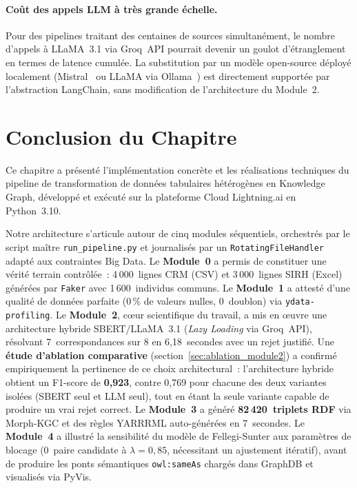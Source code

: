 \paragraph{Coût des appels LLM à très grande échelle.}
Pour des pipelines traitant des centaines de sources simultanément,
le nombre d'appels à LLaMA~3.1 via Groq~API pourrait devenir un
goulot d'étranglement en termes de latence cumulée. La substitution
par un modèle open-source déployé localement (Mistral~\cite{jiang2023mistral}
ou LLaMA via Ollama~\cite{ollama2024}) est directement supportée par
l'abstraction LangChain, sans modification de l'architecture du
Module~2.

\section{Conclusion du Chapitre}
\label{sec:chap3_conclusion}

Ce chapitre a présenté l'implémentation concrète et les réalisations
techniques du pipeline de transformation de données tabulaires
hétérogènes en Knowledge Graph, développé et exécuté sur la plateforme
Cloud Lightning.ai en Python~3.10.

Notre architecture s'articule autour de cinq modules séquentiels,
orchestrés par le script maître \texttt{run\_pipeline.py} et
journalisés par un \texttt{RotatingFileHandler} adapté aux contraintes
Big Data. Le \textbf{Module~0} a permis de constituer une vérité terrain
contrôlée~: 4\,000~lignes CRM (CSV) et 3\,000~lignes SIRH (Excel)
générées par \texttt{Faker} avec 1\,600~individus communs. Le
\textbf{Module~1} a attesté d'une qualité de données parfaite (0\,\% de
valeurs nulles, 0~doublon) via \texttt{ydata-profiling}. Le
\textbf{Module~2}, cœur scientifique du travail, a mis en œuvre une
architecture hybride SBERT/LLaMA~3.1 (\textit{Lazy Loading} via Groq~API),
résolvant 7~correspondances sur 8 en 6,18~secondes avec un rejet
justifié. Une \textbf{étude d'ablation comparative}
(section~\ref{sec:ablation_module2}) a confirmé empiriquement la
pertinence de ce choix architectural~: l'architecture hybride obtient
un F1-score de \textbf{0,923}, contre 0,769 pour chacune des deux
variantes isolées (SBERT seul et LLM seul), tout en étant la seule
variante capable de produire un vrai rejet correct. Le \textbf{Module~3} a généré \textbf{82\,420~triplets RDF}
via Morph-KGC et des règles YARRRML auto-générées en 7~secondes. Le
\textbf{Module~4} a illustré la sensibilité du modèle de Fellegi-Sunter
aux paramètres de blocage (0~paire candidate à $\lambda = 0{,}85$,
nécessitant un ajustement itératif), avant de produire les ponts
sémantiques \texttt{owl:sameAs} chargés dans GraphDB et visualisés
via PyVis.

